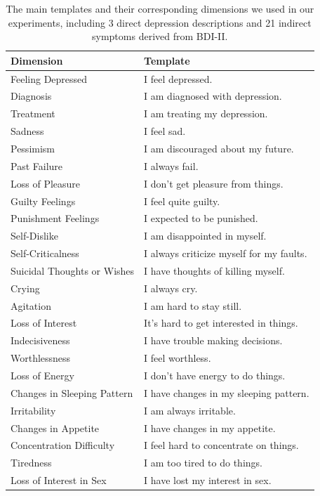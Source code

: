 \documentclass{article}
\begin{document}
\begin{table}
  \centering
  \small
  \begin{tabular}{l|l}
  \hline
  Dimension & Template \\
  \hline
  Feeling Depressed  &  I feel depressed. \\
  Diagnosis &  I am diagnosed with depression. \\
  Treatment &  I am treating my depression. \\
  \hline
  Sadness & I feel sad.  \\
  Pessimism & I am discouraged about my future.  \\
  Past Failure & I always fail. \\
  Loss of Pleasure & I don't get pleasure from things. \\
  Guilty Feelings & I feel quite guilty. \\
  Punishment Feelings & I expected to be punished. \\
  Self-Dislike & I am disappointed in myself. \\
  Self-Criticalness & I always criticize myself for my faults. \\
  Suicidal Thoughts or Wishes & I have thoughts of killing myself. \\
  Crying & I always cry. \\
  Agitation & I am hard to stay still. \\
  Loss of Interest & It's hard to get interested in things. \\
  Indecisiveness & I have trouble making decisions. \\
  Worthlessness & I feel worthless. \\
  Loss of Energy & I don't have energy to do things. \\
  Changes in Sleeping Pattern & I have changes in my sleeping pattern. \\
  Irritability & I am always irritable. \\
  Changes in Appetite & I have changes in my appetite. \\
  Concentration Difficulty & I feel hard to concentrate on things. \\
  Tiredness  & I am too tired to do things. \\
  Loss of Interest in Sex & I have lost my interest in sex. \\
  \hline
  \end{tabular}
  \caption{The main templates and their corresponding dimensions we used in our experiments, including 3 direct depression descriptions and 21 indirect symptoms derived from BDI-II. }
  \label{tab:BDI-II} 
\end{table}
\end{document}
